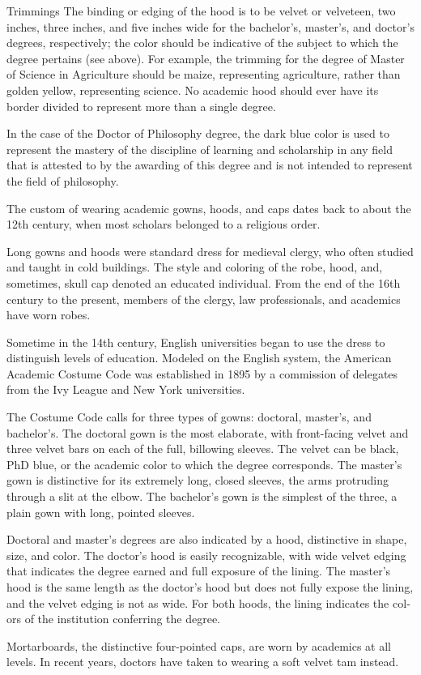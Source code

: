 \documentclass{tufte-handout}
\begin{document}
Trimmings
The binding or edging of the hood is to be velvet or velveteen, two inches, three inches, and five inches wide for the bachelor's, master's, and doctor's degrees, respectively; the color should be indicative of the subject to which the degree pertains (see above). For example, the trimming for the degree of Master of Science in Agriculture should be maize, representing agriculture, rather than golden yellow, representing science. No academic hood should ever have its border divided to represent more than a single degree.

In the case of the Doctor of Philosophy degree, the dark blue color is used to represent the mastery of the discipline of learning and scholarship in any field that is attested to by the awarding of this degree and is not intended to represent the field of philosophy.


The custom of wearing academic gowns, hoods, and caps dates back to about the 12th century, when most scholars belonged to a religious order.

Long gowns and hoods were standard dress for medieval clergy, who often studied and taught in cold buildings. The style and coloring of the robe, hood, and, sometimes, skull cap denoted an edu­cated individual. From the end of the 16th century to the present, members of the clergy, law profes­sionals, and academics have worn robes.

Sometime in the 14th century, English univer­sities began to use the dress to distinguish levels of education. Modeled on the English system, the American Academic Costume Code was estab­lished in 1895 by a commission of delegates from the Ivy League and New York universities.

The Costume Code calls for three types of gowns: doctoral, master’s, and bachelor’s. The doc­toral gown is the most elaborate, with front-facing velvet and three velvet bars on each of the full, bil­lowing sleeves. The velvet can be black, PhD blue, or the academic color to which the degree corre­sponds. The master’s gown is distinctive for its ex­tremely long, closed sleeves, the arms protruding through a slit at the elbow. The bachelor’s gown is the simplest of the three, a plain gown with long, pointed sleeves.

Doctoral and master’s degrees are also indicat­ed by a hood, distinctive in shape, size, and color. The doctor’s hood is easily recognizable, with wide velvet edging that indicates the degree earned and full exposure of the lining. The master’s hood is the same length as the doctor’s hood but does not fully expose the lining, and the velvet edging is not as wide. For both hoods, the lining indicates the col­ors of the institution conferring the degree.

Mortarboards, the distinctive four-pointed caps, are worn by academics at all levels. In recent years, doctors have taken to wearing a soft velvet tam instead.
\end{document}
